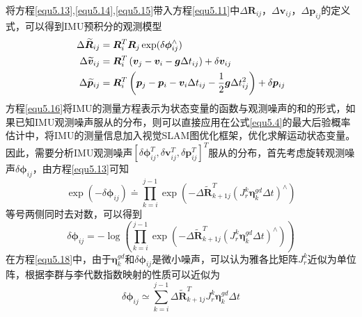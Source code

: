 将方程\eqref{equ5.13},\eqref{equ5.14},\eqref{equ5.15}带入方程\eqref{equ5.11}中$\Delta \boldsymbol{R}_{ij}$，$\Delta \boldsymbol{v}_{ij}$，$\Delta \boldsymbol{p}_{ij}$的定义式，可以得到IMU预积分的观测模型
\begin{equation}
\label{equ5.16}
\begin{aligned}
\Delta \widetilde{\boldsymbol{R}}_{ij} &= \boldsymbol{R}_i^T \boldsymbol{R}_j \exp(\delta \boldsymbol{\phi}_{ij}^{\wedge}) 
\\ 
\Delta \widetilde{\boldsymbol{v}}_{ij} &= \boldsymbol{R}_i^T \left(\boldsymbol{v}_j-\boldsymbol{v}_i-\boldsymbol{g}\Delta t_{ij} \right)+\delta \boldsymbol{v}_{ij} 
\\
\Delta \widetilde{\boldsymbol{p}}_{ij} &= \boldsymbol{R}_i^T \left( \boldsymbol{p}_j-\boldsymbol{p}_i-\boldsymbol{v}_i \Delta t_{ij} -{1 \over 2} \boldsymbol{g} \Delta t_{ij}^2 \right) + \delta \boldsymbol{p}_{ij}
\end{aligned}
\end{equation}
方程\eqref{equ5.16}将IMU的测量方程表示为状态变量的函数与观测噪声的和的形式，如果已知IMU观测噪声服从的分布，则可以直接应用在公式\eqref{equ5.4}的最大后验概率估计中，将IMU的测量信息加入视觉SLAM图优化框架，优化求解运动状态变量。因此，需要分析IMU观测噪声$[\delta \boldsymbol{\phi}_{ij}^T,\delta \boldsymbol{v}_{ij}^T,\delta \boldsymbol{p}_{ij}^T]^T$服从的分布，首先考虑旋转观测噪声$\delta \boldsymbol{\phi}_{ij}$，由方程\eqref{equ5.13}可知
\begin{equation}
\label{equ5.17}
\exp \left( -\delta \boldsymbol{\phi}_{ij} \right) \doteq \prod\limits_{k=i}^{j-1} \exp \left( -\Delta \widetilde{\boldsymbol{R}}_{k+1j}^T \left( J_r^k \boldsymbol{\eta}_k^{gd} \Delta t \right)^{\wedge}  \right)
\end{equation}
等号两侧同时去对数，可以得到
\begin{equation}
\label{equ5.18}
\delta \boldsymbol{\phi}_{ij} = -\log \left( \prod\limits_{k=i}^{j-1} \exp \left( -\Delta \widetilde{\boldsymbol{R}}_{k+1j}^T \left( J_r^k \boldsymbol{\eta}_k^{gd} \Delta t \right)^{\wedge}  \right) \right)
\end{equation}
在方程\eqref{equ5.18}中，由于$\boldsymbol{\eta}_k^{gd}$和$\delta \boldsymbol{\phi}_{ij}$是微小噪声，可以认为雅各比矩阵$J_r^k$近似为单位阵，根据李群与李代数指数映射的性质可以近似为
\begin{equation}
\label{equ5.19}
\delta \boldsymbol{\phi}_{ij} \simeq \sum\limits_{k=i}^{j-1} \Delta \widetilde{\boldsymbol{R}}_{k+1j}^T  J_r^k \boldsymbol{\eta}_k^{gd} \Delta t
\end{equation}
